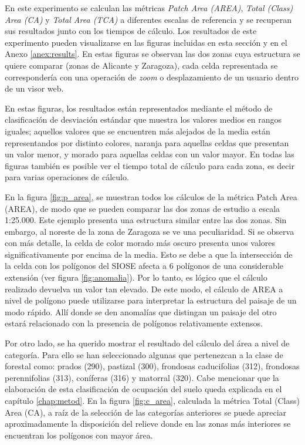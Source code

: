 En este experimento se calculan las métricas \textit{Patch Area (AREA)}, \textit{Total (Class) Area (CA)} y \textit{Total Area (TCA)} a diferentes escalas de referencia y se recuperan sus resultados junto con los tiempos de cálculo. Los resultados de este experimento pueden visualizarse en las figuras incluidas en esta sección y en el Anexo \ref{anex:results}. En estas figuras se observan las dos zonas cuya estructura se quiere comparar (zonas de Alicante y Zaragoza), cada celda representada se correspondería con una operación de \textit{zoom} o desplazamiento de un usuario dentro de un visor web.

En estas figuras, los resultados están representados mediante el método de clasificación de desviación estándar que muestra los valores medios en rangos iguales; aquellos valores que se encuentren más alejados de la media están representandos por distinto colores, naranja para aquellas celdas que presentan un valor menor, y morado para aquellas celdas con un valor mayor. En todas las figuras también es posible ver el tiempo total de cálculo para cada zona, es decir para varias operaciones de cálculo.

En la figura \ref{fig:p_area}, se muestran todos los cálculos de la métrica Patch Area (AREA), de modo que se pueden comparar las dos zonas de estudio a escala 1:25.000. Este ejemplo presenta una estructura similar entre las dos zonas. Sin embargo, al noreste de la zona de Zaragoza se ve una peculiaridad. Si se observa con más detalle, la celda de color morado más oscuro presenta unos valores significativamente por encima de la media. Esto se debe a que la intersección de la celda con los polígonos del SIOSE afecta a 6 polígonos de una considerable extensión (ver figura \ref{fig:anomalia}). Por lo tanto, es lógico que el cálculo realizado devuelva un valor tan elevado. De este modo, el cálculo de AREA a nivel de polígono puede utilizarse para interpretar la estructura del paisaje de un modo rápido. Allí donde se den anomalías que distingan un paisaje del otro estará relacionado con la presencia de polígonos relativamente extensos.

Por otro lado, se ha querido mostrar el resultado del cálculo del área a nivel de categoría. Para ello se han seleccionado algunas que pertenezcan a la clase de forestal como: prados (290), pastizal (300), frondosas caducifolias (312), frondosas perennifolias (313), coníferas (316) y matorral (320). Cabe mencionar que la elaboración de esta clasificación de ocupación del suelo queda explicada en el capítulo \ref{chap:metod}. En la figura \ref{fig:c_area}, calculada la métrica Total (Class) Area (CA), a raíz de la selección de las categorías anteriores se puede apreciar aproximadamente la disposición del relieve donde en las zonas más interiores se encuentran los polígonos con mayor área.

